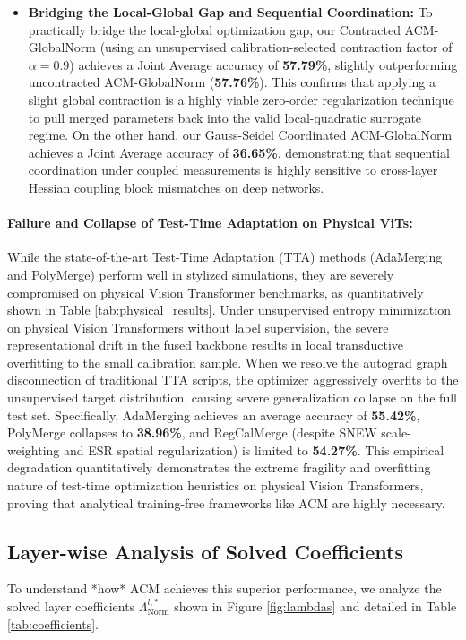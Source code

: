 \begin{itemize}
    \item \textbf{Bridging the Local-Global Gap and Sequential Coordination:} To practically bridge the local-global optimization gap, our Contracted ACM-GlobalNorm (using an unsupervised calibration-selected contraction factor of $\alpha=0.9$) achieves a Joint Average accuracy of \textbf{57.79\%}, slightly outperforming uncontracted ACM-GlobalNorm (\textbf{57.76\%}). This confirms that applying a slight global contraction is a highly viable zero-order regularization technique to pull merged parameters back into the valid local-quadratic surrogate regime. On the other hand, our Gauss-Seidel Coordinated ACM-GlobalNorm achieves a Joint Average accuracy of \textbf{36.65\%}, demonstrating that sequential coordination under coupled measurements is highly sensitive to cross-layer Hessian coupling block mismatches on deep networks.
\end{itemize}

\paragraph{Failure and Collapse of Test-Time Adaptation on Physical ViTs:}
While the state-of-the-art Test-Time Adaptation (TTA) methods (AdaMerging and PolyMerge) perform well in stylized simulations, they are severely compromised on physical Vision Transformer benchmarks, as quantitatively shown in Table \ref{tab:physical_results}. Under unsupervised entropy minimization on physical Vision Transformers without label supervision, the severe representational drift in the fused backbone results in local transductive overfitting to the small calibration sample. When we resolve the autograd graph disconnection of traditional TTA scripts, the optimizer aggressively overfits to the unsupervised target distribution, causing severe generalization collapse on the full test set. Specifically, AdaMerging achieves an average accuracy of \textbf{55.42\%}, PolyMerge collapses to \textbf{38.96\%}, and RegCalMerge (despite SNEW scale-weighting and ESR spatial regularization) is limited to \textbf{54.27\%}. This empirical degradation quantitatively demonstrates the extreme fragility and overfitting nature of test-time optimization heuristics on physical Vision Transformers, proving that analytical training-free frameworks like ACM are highly necessary.

\subsection{Layer-wise Analysis of Solved Coefficients}
To understand *how* ACM achieves this superior performance, we analyze the solved layer coefficients $\Lambda^{l, *}_{\text{Norm}}$ shown in Figure \ref{fig:lambdas} and detailed in Table \ref{tab:coefficients}.

